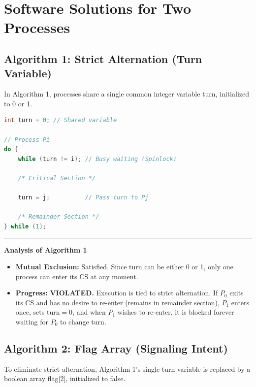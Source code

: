 \documentclass[11pt,a4paper]{article}
\newcommand{\ic}[1]{\mbox{\colorbox{AnthCodeBG}{\footnotesize\ttfamily\textcolor{AnthBlue}{#1}}}}
\newcommand{\concept}[1]{%
  \noindent\textcolor{AnthGreen}{\rule{3pt}{10pt}}\enspace
  \textbf{\color{AnthDark}#1}\par\vspace{2pt}%
}
\begin{document}
\section{Software Solutions for Two Processes}

\subsection{Algorithm 1: Strict Alternation (Turn Variable)}

In Algorithm 1, processes share a single common integer variable \ic{turn}, initialized to \ic{0} or \ic{1}.

\begin{tcolorbox}[codebox, title={Algorithm 1: Structure of Process $P_i$ (where $j = 1 - i$)}]
\begin{lstlisting}[language=C]
int turn = 0; // Shared variable

// Process Pi
do {
    while (turn != i); // Busy waiting (Spinlock)
    
    /* Critical Section */
    
    turn = j;          // Pass turn to Pj
    
    /* Remainder Section */
} while (1);
\end{lstlisting}
\end{tcolorbox}

\concept{Analysis of Algorithm 1}
\begin{itemize}
    \item \textbf{Mutual Exclusion:} Satisfied. Since \ic{turn} can be either 0 or 1, only one process can enter its CS at any moment.
    \item \textbf{Progress:} \textbf{VIOLATED.} Execution is tied to strict alternation. If $P_0$ exits its CS and has no desire to re-enter (remains in remainder section), $P_1$ enters once, sets $\text{turn} = 0$, and when $P_1$ wishes to re-enter, it is blocked forever waiting for $P_0$ to change \ic{turn}.
\end{itemize}

\subsection{Algorithm 2: Flag Array (Signaling Intent)}

To eliminate strict alternation, Algorithm 1's single turn variable is replaced by a boolean array \ic{flag[2]}, initialized to \ic{false}.
\end{document}
